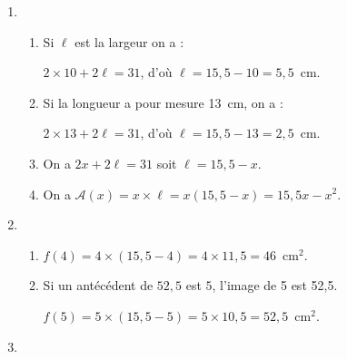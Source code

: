 
\medskip

\begin{enumerate}
\item 
	\begin{enumerate}
		\item %
Si $\ell$ est la largeur on a :
		
$2\times 10 + 2\ell = 31$, d'où $\ell = 15,5 - 10 = 5,5$~cm. 
		\item %
Si la longueur a pour mesure 13~cm, on a :
		
$2\times 13 + 2\ell = 31$, d'où $\ell = 15,5 - 13 = 2,5$~cm.		 
		\item %

On a $2x + 2\ell = 31$ soit $\ell = 15,5 - x$.
		\item %
On a $\mathcal{A}(x) = x \times \ell = x(15,5 - x) = 15,5x - x^2$. 
	\end{enumerate}
\item %
	\begin{enumerate}
		\item %
$f(4) = 4 \times (15,5 - 4) = 4 \times 11,5 = 46$~cm$^2$. 
		\item %
Si  un antécédent de $52,5$ est $5$, l'image de 5 est 52,5.

$f(5) = 5 \times (15,5 - 5) = 5 \times 10,5 = 52,5$~cm$^2$.
	\end{enumerate}
\item %

% 


\end{enumerate}
